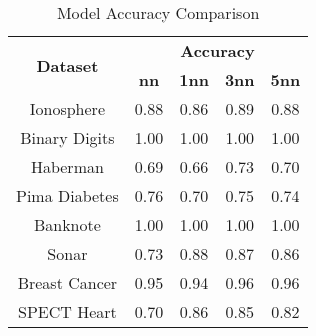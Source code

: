 \begin{table}[htbp]
\caption{Model Accuracy Comparison}
\begin{center}
\begin{tabular}{|c|c|c|c|c|}
\hline
\multirow{2}{*}{\textbf{Dataset}} & \multicolumn{4}{c|}{\textbf{Accuracy}} \\ \cline{2-5}
 & \textbf{nn} & \textbf{1nn} & \textbf{3nn} & \textbf{5nn} \\ \hline
Ionosphere & 0.88 & 0.86 & 0.89 & 0.88 \\ \hline
Binary Digits & 1.00 & 1.00 & 1.00 & 1.00 \\ \hline
Haberman & 0.69 & 0.66 & 0.73 & 0.70 \\ \hline
Pima Diabetes & 0.76 & 0.70 & 0.75 & 0.74 \\ \hline
Banknote & 1.00 & 1.00 & 1.00 & 1.00 \\ \hline
Sonar & 0.73 & 0.88 & 0.87 & 0.86 \\ \hline
Breast Cancer & 0.95 & 0.94 & 0.96 & 0.96 \\ \hline
SPECT Heart & 0.70 & 0.86 & 0.85 & 0.82 \\ \hline
\end{tabular}
\label{tab:accuracy}
\end{center}
\end{table}